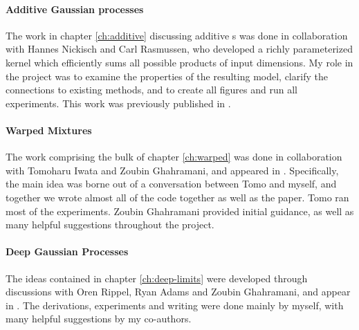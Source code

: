 \paragraph{Additive Gaussian processes}

The work in chapter \ref{ch:additive} discussing additive \gp{}s was done in collaboration with Hannes Nickisch and Carl Rasmussen, who developed a richly parameterized kernel which efficiently sums all possible products of input dimensions.
My role in the project was to examine the properties of the resulting model, clarify the connections to existing methods, and to create all figures and run all experiments.
This work was previously published in \citep{duvenaud2011additive11}.


\paragraph{Warped Mixtures}
The work comprising the bulk of chapter \ref{ch:warped} was done in collaboration with Tomoharu Iwata and Zoubin Ghahramani, and appeared in \citep{IwaDuvGha12}.
Specifically, the main idea was borne out of a conversation between Tomo and myself, and together we wrote almost all of the code together as well as the paper.
Tomo ran most of the experiments.
Zoubin Ghahramani provided initial guidance, as well as many helpful suggestions throughout the project.


\paragraph{Deep Gaussian Processes}
The ideas contained in chapter \ref{ch:deep-limits} were developed through discussions with Oren Rippel, Ryan Adams and Zoubin Ghahramani, and appear in \citep{DuvRipAdaGha14}.  The derivations, experiments and writing were done mainly by myself, with many helpful suggestions by my co-authors.

\outbpdocument{


}



